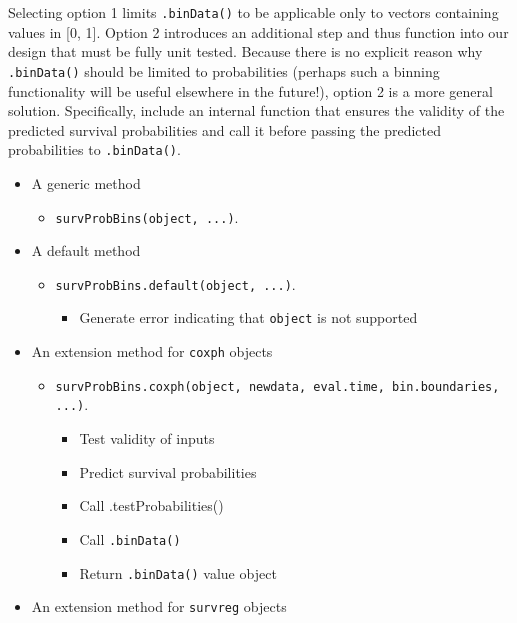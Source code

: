 \documentclass[
]{book}
\providecommand{\tightlist}{%
  \setlength{\itemsep}{0pt}\setlength{\parskip}{0pt}}
\begin{document}
Selecting option 1 limits \texttt{.binData()} to be applicable only to vectors containing values in {[}0, 1{]}. Option 2 introduces an additional step and thus function into our design that must be fully unit tested. Because there is no explicit reason why \texttt{.binData()} should be limited to probabilities (perhaps such a binning functionality will be useful elsewhere in the future!), option 2 is a more general solution. Specifically, include an internal function that ensures the validity of the predicted survival probabilities and call it before passing the predicted probabilities to \texttt{.binData()}.

\begin{itemize}
\tightlist
\item
  A generic method

  \begin{itemize}
  \tightlist
  \item
    \texttt{survProbBins(object,\ ...)}.
  \end{itemize}
\item
  A default method

  \begin{itemize}
  \tightlist
  \item
    \texttt{survProbBins.default(object,\ ...)}.

    \begin{itemize}
    \tightlist
    \item
      Generate error indicating that \texttt{object} is not supported
    \end{itemize}
  \end{itemize}
\item
  An extension method for \texttt{coxph} objects

  \begin{itemize}
  \tightlist
  \item
    \texttt{survProbBins.coxph(object,\ newdata,\ eval.time,\ bin.boundaries,\ ...)}.

    \begin{itemize}
    \tightlist
    \item
      Test validity of inputs
    \item
      Predict survival probabilities
    \item
      Call .testProbabilities()
    \item
      Call \texttt{.binData()}
    \item
      Return \texttt{.binData()} value object
    \end{itemize}
  \end{itemize}
\item
  An extension method for \texttt{survreg} objects


\end{itemize}
\end{document}

